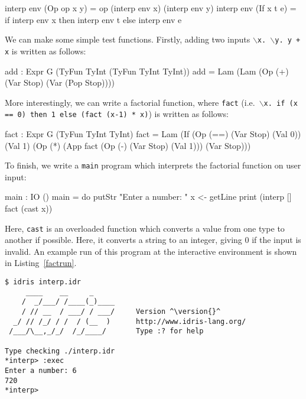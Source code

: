 \begin{code}
interp env (Op op x y) = op (interp env x) (interp env y)
interp env (If x t e)  = if interp env x then interp env t
                                         else interp env e
\end{code}

\noindent
We can make some simple test functions. Firstly, adding two inputs
\texttt{$\backslash$x. $\backslash$y. y + x} is written as follows:

\begin{code}
add : Expr G (TyFun TyInt (TyFun TyInt TyInt))
add = Lam (Lam (Op (+) (Var Stop) (Var (Pop Stop))))
\end{code}

\noindent
More interestingly, we can write a factorial function, where
\texttt{fact} (i.e.\ \texttt{$\backslash$x. if (x == 0) then 1 else (fact (x-1) * x)}) is written as follows:

\begin{code}
fact : Expr G (TyFun TyInt TyInt)
fact = Lam (If (Op (==) (Var Stop) (Val 0))
               (Val 1) (Op (*) (App fact (Op (-) (Var Stop) (Val 1)))
                               (Var Stop)))
\end{code}

\noindent
To finish, we write a \texttt{main} program which interprets the factorial function on user input:

\begin{code}
main : IO ()
main = do putStr "Enter a number: "
          x <- getLine
          print (interp [] fact (cast x))
\end{code}

\noindent
Here, \texttt{cast} is an overloaded function which converts a value from one type to another if possible.
Here, it converts a string to an integer, giving 0 if the input is invalid.
An example run of this program at the \Idris{} interactive environment is shown in Listing~\ref{factrun}.

\begin{lstlisting}[float=h,caption={Running the well-typed interpreter}, label=factrun, style=stdout]
$ idris interp.idr
     ____    __     _
    /  _/___/ /____(_)____
    / // __  / ___/ / ___/     Version ^\version{}^
  _/ // /_/ / /  / (__  )      http://www.idris-lang.org/
 /___/\__,_/_/  /_/____/       Type :? for help

Type checking ./interp.idr
*interp> :exec
Enter a number: 6
720
*interp>
\end{lstlisting}

